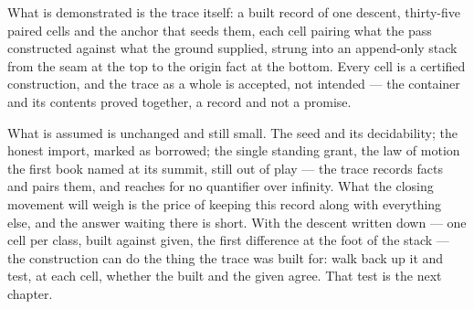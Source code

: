 What is demonstrated is the trace itself: a built record of one descent, thirty-five paired cells and the
anchor that seeds them, each cell pairing what the pass constructed against what the ground supplied, strung
into an append-only stack from the seam at the top to the origin fact at the bottom. Every cell is a
certified construction, and the trace as a whole is accepted, not intended --- the container and its
contents proved together, a record and not a promise.

What is assumed is unchanged and still small. The seed and its decidability; the honest import, marked as
borrowed; the single standing grant, the law of motion the first book named at its summit, still out of
play --- the trace records facts and pairs them, and reaches for no quantifier over infinity. What the
closing movement will weigh is the price of keeping this record along with everything else, and the answer
waiting there is short. With the descent written down --- one cell per class, built against given, the
first difference at the foot of the stack --- the construction can do the thing the trace was built for:
walk back up it and test, at each cell, whether the built and the given agree. That test is the next
chapter.

